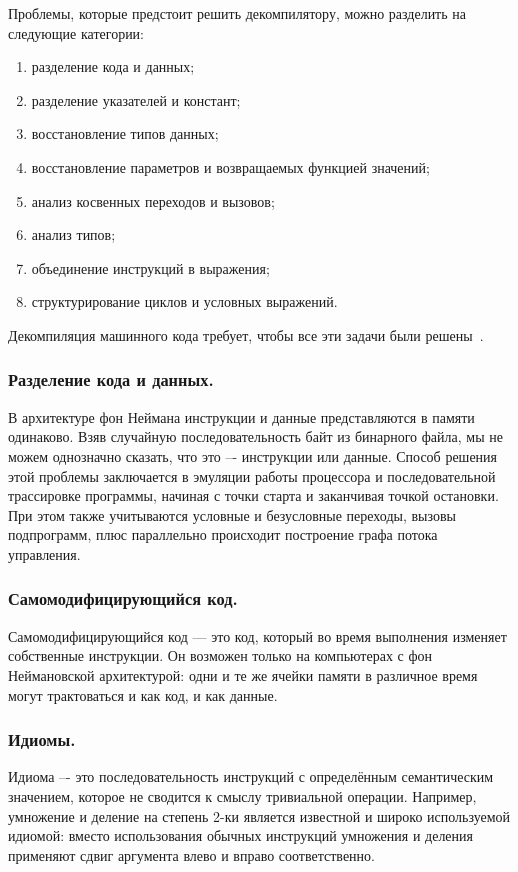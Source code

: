 Проблемы, которые предстоит решить декомпилятору, можно разделить на следующие категории:
\label{deproblems}

\begin{enumerate}
\item разделение кода и данных;
\item разделение указателей и констант;
\item восстановление типов данных;
\item восстановление параметров и возвращаемых функцией значений;
\item анализ косвенных переходов и вызовов;
\item анализ типов;
\item объединение инструкций в выражения;
\item структурирование циклов и условных выражений.
\end{enumerate}

Декомпиляция машинного кода требует, чтобы все эти задачи были решены~\cite{problems}.

\subsubsection*{Разделение кода и данных.}
В архитектуре фон Неймана инструкции и данные представляются в памяти одинаково. Взяв случайную последовательность байт из бинарного файла, мы не можем однозначно сказать, что это –- инструкции или данные. Способ решения этой проблемы заключается в эмуляции работы процессора и последовательной трассировке программы, начиная с точки старта и заканчивая точкой остановки. При этом также учитываются условные и безусловные переходы, вызовы подпрограмм, плюс параллельно происходит построение графа потока управления.
\subsubsection*{Самомодифицирующийся код.}
Самомодифицирующийся код --- это код, который во время выполнения изменяет собственные инструкции. Он возможен только на компьютерах с фон Неймановской архитектурой: одни и те же ячейки памяти в различное время могут трактоваться и как код, и как данные.
\subsubsection*{Идиомы.}
Идиома –- это последовательность инструкций с определённым семантическим значением, которое не сводится к смыслу тривиальной операции. Например, умножение и деление на степень 2-ки является известной и широко используемой идиомой: вместо использования обычных инструкций умножения и деления применяют сдвиг аргумента влево и вправо соответственно.

